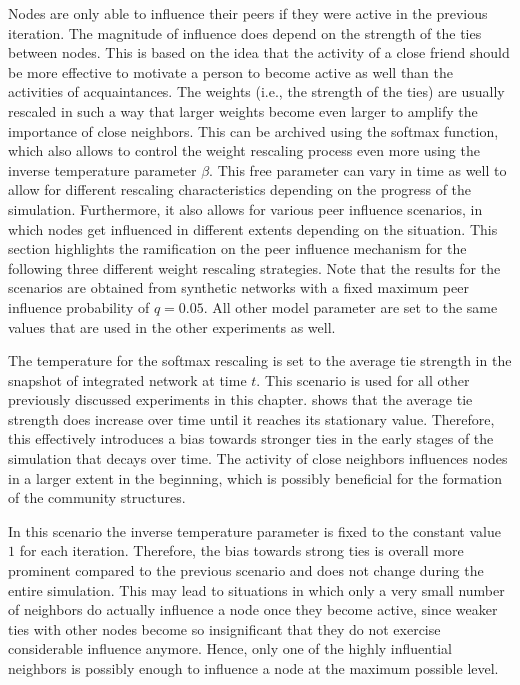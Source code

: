 Nodes are only able to influence their peers if they were active in the previous iteration.
The magnitude of influence does depend on the strength of the ties between nodes.
This is based on the idea that the activity of a close friend should be more effective to motivate a person to become active as well than the activities of acquaintances.
The weights (i.e., the strength of the ties) are usually rescaled in such a way that larger weights become even larger to amplify the importance of close neighbors.
This can be archived using the softmax function, which also allows to control the weight rescaling process even more using the inverse temperature parameter \( \beta \).
This free parameter can vary in time as well to allow for different rescaling characteristics depending on the progress of the simulation.
Furthermore, it also allows for various peer influence scenarios, in which nodes get influenced in different extents depending on the situation.
This section highlights the ramification on the peer influence mechanism for the following three different weight rescaling strategies.
Note that the results for the scenarios are obtained from synthetic networks with a fixed maximum peer influence probability of \( q = 0.05 \).
All other model parameter are set to the same values that are used in the other experiments as well.

The temperature for the softmax rescaling is set to the average tie strength in the snapshot of integrated network at time \( t \).
This scenario is used for all other previously discussed experiments in this chapter.
 shows that the average tie strength does increase over time until it reaches its stationary value.
Therefore, this effectively introduces a bias towards stronger ties in the early stages of the simulation that decays over time.
The activity of close neighbors influences nodes in a larger extent in the beginning, which is possibly beneficial for the formation of the community structures.

In this scenario the inverse temperature parameter is fixed to the constant value \( 1 \) for each iteration.
Therefore, the bias towards strong ties is overall more prominent compared to the previous scenario and does not change during the entire simulation.
This may lead to situations in which only a very small number of neighbors do actually influence a node once they become active, since weaker ties with other nodes become so insignificant that they do not exercise considerable influence anymore.
Hence, only one of the highly influential neighbors is possibly enough to influence a node at the maximum possible level.

